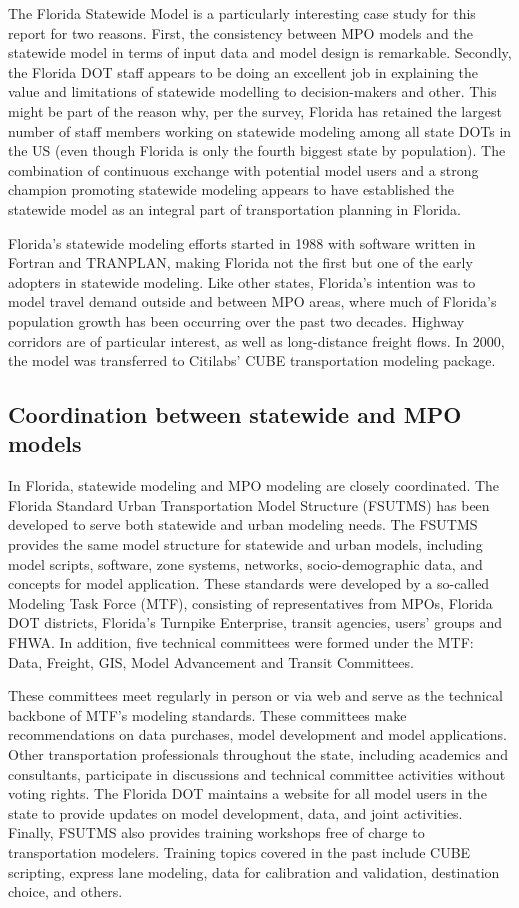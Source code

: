 The Florida Statewide Model is a particularly interesting case study for this report for two reasons. First, the consistency between MPO models and the statewide model in terms of input data and model design is remarkable. Secondly, the Florida DOT staff appears to be doing an excellent job in explaining the value and limitations of statewide modelling to decision-makers and other. This might be part of the reason why, per the survey, Florida has retained the largest number of staff members working on statewide modeling among all state DOTs in the US (even though Florida is only the fourth biggest state by population). The combination of continuous exchange with potential model users and a strong champion promoting statewide modeling appears to have established the statewide model as an integral part of transportation planning in Florida.

Florida's statewide modeling efforts started in 1988 with software written in Fortran and TRANPLAN, making Florida not the first but one of the early adopters in statewide modeling. Like other states, Florida's intention was to model travel demand outside and between MPO areas, where much of Florida's population growth has been occurring over the past two decades. Highway corridors are of particular interest, as well as long-distance freight flows. In 2000, the model was transferred to Citilabs' CUBE transportation modeling package.

\subsection{Coordination between statewide and MPO models}

In Florida, statewide modeling and MPO modeling are closely coordinated. The Florida Standard Urban Transportation Model Structure (FSUTMS) has been developed to serve both statewide and urban modeling needs. The FSUTMS provides the same model structure for statewide and urban models, including model scripts, software, zone systems, networks, socio-demographic data, and concepts for model application. These standards were developed by a so-called Modeling Task Force (MTF), consisting of representatives from MPOs, Florida DOT districts, Florida's Turnpike Enterprise, transit agencies, users' groups and FHWA. In addition, five technical committees were formed under the MTF: Data, Freight, GIS, Model Advancement and Transit Committees. 

These committees meet regularly in person or via web and serve as the technical backbone of MTF's modeling standards. These committees make recommendations on data purchases, model development and model applications. Other transportation professionals throughout the state, including academics and consultants, participate in discussions and technical committee activities without voting rights. The Florida DOT maintains a website for all model users in the state to provide updates on model development, data, and joint activities. Finally, FSUTMS also provides training workshops free of charge to transportation modelers. Training topics covered in the past include CUBE scripting, express lane modeling, data for calibration and validation, destination choice, and others.

